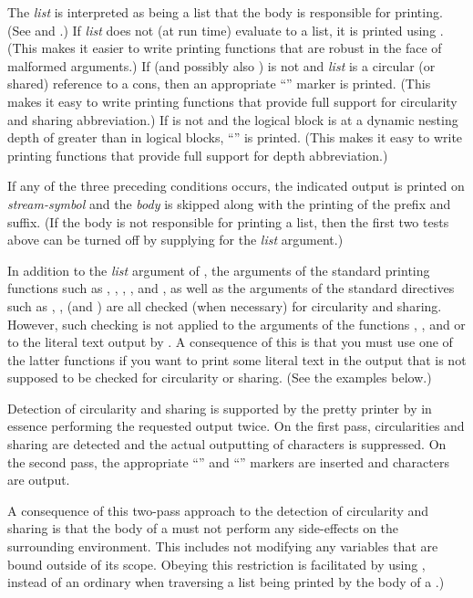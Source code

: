 \begin{defmac}
The \emph{list} is interpreted as being a list that the body is responsible
for printing.  (See  and
.)  If \emph{list} does not (at run time) evaluate to a list,
it is printed using .  (This makes it easier to write printing
functions that are robust in the face of malformed arguments.)  If
 (and possibly also )
is not  and \emph{list} is a circular (or shared) reference
to a cons, then an appropriate ``'' marker is printed.
(This makes it easy to write printing functions that provide full support
for circularity and sharing abbreviation.)  If  is not
 and the logical block is at a dynamic nesting depth of greater
than  in logical blocks, ``\cd{\#}'' is printed.  (This
makes it easy to write printing functions that provide full support for depth
abbreviation.)

If any of the three preceding conditions occurs, the indicated output is
printed on \emph{stream-symbol} and the \emph{body} is skipped along with the
printing of the prefix and suffix.  (If the
body is not responsible for printing a list, then the first two tests
above can be turned off by supplying  for the \emph{list} argument.)

In addition to the \emph{list} argument of , the
arguments of the standard printing functions such as ,
, , , and , as well as the
arguments of the standard  directives such as ,
, (and ) are all checked (when necessary) for
circularity and sharing.  However, such checking is not applied to the
arguments of the functions , , and
 or to the literal text output by .  A
consequence of this is that you must use one of the latter functions if you
want to print some literal text in the output that is not supposed to be
checked for circularity or sharing.  (See the examples below.)

\beforenoterule
\begin{implementation}
Detection of circularity and sharing is supported by the pretty printer by
in essence performing the requested output twice.  On the first pass,
circularities and sharing are detected and the actual outputting of
characters is suppressed.  On the second pass, the appropriate 
``'' and ``'' markers are inserted and
characters are output.

A consequence of this two-pass approach to the detection of circularity and
sharing is that the body of a  must not
perform any side-effects on the surrounding environment.  This includes not
modifying any variables that are bound outside of its scope.  Obeying this
restriction is facilitated by using , instead of an ordinary
 when traversing a list being printed by the body of a
.)
\end{implementation}
\afternoterule
\end{defmac}

